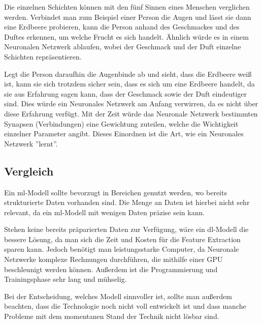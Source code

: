 Die einzelnen Schichten können mit den fünf Sinnen eines Menschen verglichen werden. Verbindet man zum Beispiel einer Person die Augen und lässt sie dann eine Erdbeere probieren, kann die Person anhand des Geschmackes und des Duftes erkennen, um welche Frucht es sich handelt. Ähnlich würde es in einem Neuronalen Netzwerk ablaufen, wobei der Geschmack und der Duft einzelne Schichten repräsentieren.

Legt die Person daraufhin die Augenbinde ab und sieht, dass die Erdbeere weiß ist, kann sie sich trotzdem sicher sein, dass es sich um eine Erdbeere handelt, da sie aus Erfahrung sagen kann, dass der Geschmack sowie der Duft eindeutiger sind. Dies würde ein Neuronales Netzwerk am Anfang verwirren, da es nicht über diese Erfahrung verfügt. Mit der Zeit würde das Neuronale Netzwerk bestimmten Synapsen (Verbindungen) eine Gewichtung zuteilen, welche die Wichtigkeit einzelner Parameter angibt. Dieses Einordnen ist die Art, wie ein Neuronales Netzwerk ''lernt''.\cite{NN}

\subsection{Vergleich}

Ein \gls{ml}-Modell sollte bevorzugt in Bereichen genutzt werden, wo bereits strukturierte Daten vorhanden sind. Die Menge an Daten ist hierbei nicht sehr relevant, da ein \gls{ml}-Modell mit wenigen Daten präzise sein kann.

Stehen keine bereits präparierten Daten zur Verfügung, wäre ein \gls{dl}-Modell die bessere Lösung, da man sich die Zeit und Kosten für die Feature Extraction sparen kann. Jedoch benötigt man leistungsstarke Computer, da Neuronale Netzwerke komplexe Rechnungen durchführen, die mithilfe einer GPU beschleunigt werden können. Außerdem ist die Programmierung und Trainingsphase sehr lang und mühselig. \cite{MLvsDL}

Bei der Entscheidung, welches Modell sinnvoller ist, sollte man außerdem beachten, dass die Technologie noch nicht voll entwickelt ist und dass manche Probleme mit dem momentanen Stand der Technik nicht lösbar sind.